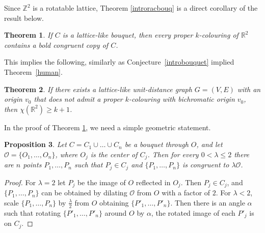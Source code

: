\documentclass[12pt]{article}
\newcommand{\R}{{\mathbb R}}
\theoremstyle{plain}
\newtheorem{theorem}{Theorem}
\newtheorem{prop}[theorem]{Proposition}
\theoremstyle{definition}
\begin{document}
Since $\mathbb{Z}^2$ is a rotatable lattice, Theorem \ref{introracbouq} is a direct corollary of the result below.

\begin{theorem}\label{latticeboq} If $C$ is a lattice-like bouquet, then every proper $k$-colouring of $\mathbb{R}^2$ contains a bold congruent copy of $C$.
\end{theorem}

This implies the following, similarly as Conjecture~\ref{introbouquet} implied Theorem~\ref{human}.

\begin{theorem}\label{implication} If there exists a lattice-like unit-distance graph $G=(V,E)$ with an origin $v_0$ that does not admit a proper $k$-colouring with bichromatic origin $v_0$, then $\chi(\R^2)\geq k+1$.
\end{theorem}



In the proof of Theorem \ref{latticeboq}, we need a simple geometric statement.

\begin{prop}\label{similar} Let $C=C_1\cup\dots\cup C_n$ be a bouquet through $O$, and let $\mathcal O=\{O_1,\dots,O_n\}$, where $O_j$ is the center of $C_j$. Then for every $0<\lambda\leq 2$ there are $n$ points $P_1,\dots,P_n$ such that $P_j\in C_j$ and $\{P_1,\dots,P_n\}$ is congruent to $\lambda \mathcal O$.
\end{prop}

\begin{proof} 
For $\lambda=2$ let $P_j$ be the image of $O$ reflected in $O_j$. Then $P_j\in C_j$, and $\{P_1,\dots,P_n\}$ can be obtained by dilating $\mathcal O$ from $O$ with a factor of $2$. For $\lambda<2$, scale $\{P_1,\dots,P_n\}$ by $\frac{\lambda}{2}$ from $O$ obtaining $\{P'_1,\dots,P'_n\}$. Then there is an angle $\alpha$ such that rotating $\{P'_1,\dots,P'_n\}$ around $O$ by $\alpha$, the rotated image of each $P'_j$ is on $C_j$. 
\end{proof}
\end{document}

